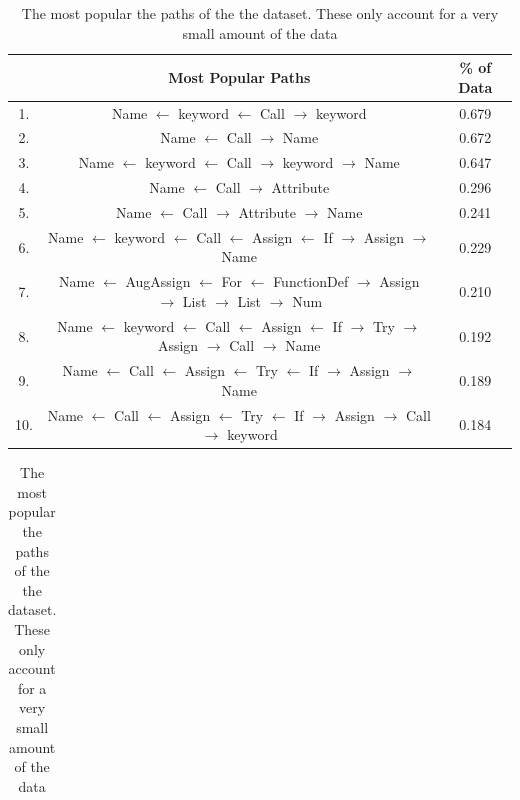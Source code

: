 \begin{table}[p]
    \centering
    \begin{tabular}{c | c | c}       
    
           & Most Popular Paths  &  \% of Data \\  
        \hline
                
        1.  & Name $\leftarrow$ keyword $\leftarrow$ Call $\rightarrow$ keyword &  0.679 \\ 
        2.  & Name $\leftarrow$ Call $\rightarrow$ Name &  0.672 \\ 
        3.  & Name $\leftarrow$ keyword $\leftarrow$ Call $\rightarrow$ keyword $\rightarrow$ Name &  0.647 \\ 
        4.  & Name $\leftarrow$ Call $\rightarrow$ Attribute &  0.296 \\ 
        5.  & Name $\leftarrow$ Call $\rightarrow$ Attribute $\rightarrow$ Name &  0.241 \\ 
        6.  & Name $\leftarrow$ keyword $\leftarrow$ Call $\leftarrow$ Assign $\leftarrow$ If $\rightarrow$ Assign $\rightarrow$ Name &  0.229 \\ 
        7.  & Name $\leftarrow$ AugAssign $\leftarrow$ For $\leftarrow$ FunctionDef $\rightarrow$ Assign $\rightarrow$ List $\rightarrow$ List $\rightarrow$ Num &  0.210 \\ 
        8.  & Name $\leftarrow$ keyword $\leftarrow$ Call $\leftarrow$ Assign $\leftarrow$ If $\rightarrow$ Try $\rightarrow$ Assign $\rightarrow$ Call $\rightarrow$ Name &  0.192 \\ 
        9.  & Name $\leftarrow$ Call $\leftarrow$ Assign $\leftarrow$ Try $\leftarrow$ If $\rightarrow$ Assign $\rightarrow$ Name &  0.189 \\ 
        10.  & Name $\leftarrow$ Call $\leftarrow$ Assign $\leftarrow$ Try $\leftarrow$ If $\rightarrow$ Assign $\rightarrow$ Call $\rightarrow$ keyword &  0.184 \\ 
  
    \end{tabular}
    \caption { The most popular the paths of the the dataset. These only account for a very small amount of the data }
    \label{table:pop_paths} 
    \begin{tabular}{c | c | c  }       
    

\end{tabular}
\end{table}
